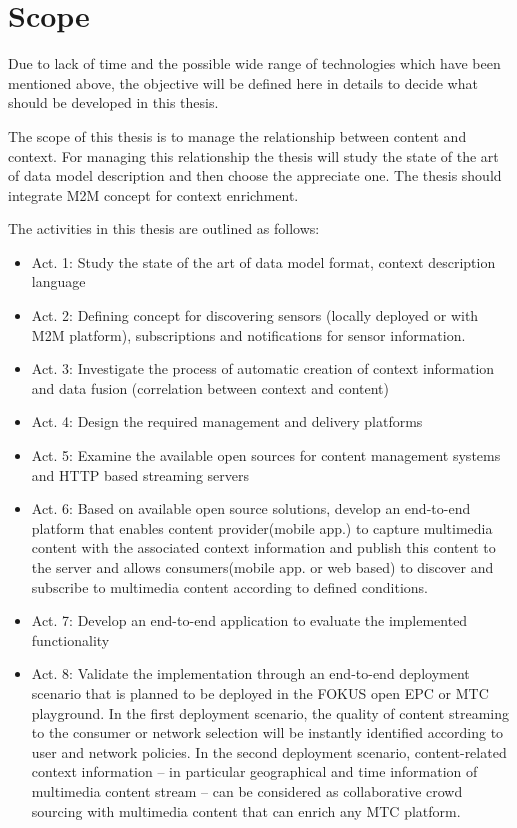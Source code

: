 \section{Scope\label{sec:scope}}

Due to lack of time and the possible wide range of technologies which have been mentioned above, the objective will be defined here in details to decide what should be developed in this thesis.

The scope of this thesis is to manage the relationship between content and context. For managing this relationship the thesis will study the state of the art of data model description and then choose the appreciate one. The thesis should integrate \ac{M2M} concept for context enrichment.


The activities in this thesis are outlined as follows:
	\begin{itemize}
		\item Act. 1: Study the state of the art of data model format, context description language
				\vspace{-0.1in} 
		\item Act. 2: Defining concept for discovering sensors (locally deployed or with \ac{M2M} platform), subscriptions and notifications for sensor information.
				\vspace{-0.1in} 
		\item Act. 3: Investigate the process of automatic creation of context information and data fusion (correlation between context and content)
				\vspace{-0.1in} 		
		\item Act. 4: Design the required management and delivery platforms 
    			\vspace{-0.1in} 
		\item Act. 5: Examine the available open sources for content management systems and \ac{HTTP} based streaming servers
 				\vspace{-0.1in} 
		\item Act. 6: Based on available open source solutions, develop an end-to-end platform that enables content provider(mobile app.) to capture multimedia content with the associated context information and publish this content to the server and allows consumers(mobile app. or web based) to discover and subscribe to multimedia content according to defined conditions. 
    			\vspace{-0.1in} 
    	\item Act. 7: Develop an end-to-end application to evaluate the implemented functionality
		\item Act. 8: Validate the implementation through an end-to-end deployment scenario that is planned to be deployed in the FOKUS open \ac{EPC} or \ac{MTC} playground. In the first deployment scenario, the quality of content streaming to the consumer or network selection will be instantly identified according to user and network policies. In the second deployment scenario, content-related context information – in particular geographical and time information of multimedia content stream – can be considered as collaborative crowd sourcing with multimedia content that can enrich any \ac{MTC} platform.
    \end{itemize}

